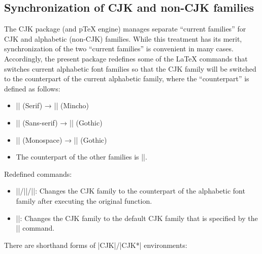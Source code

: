 \documentclass[a4paper]{article}
\newcommand{\Pkg}[1]{\textsf{#1}}
\newcommand{\Means}{:\hspace{1em plus 1em}}
\newcommand{\wbr}{\linebreak[0]}
\providecommand{\pTeX}{p\TeX}
\begin{document}
\subsection{Synchronization of CJK and non-CJK families}
\label{ssec:sync-families}

The \Pkg{CJK} package (and {\pTeX} engine) manages separate
``current families'' for CJK and alphabetic (non-CJK) families.
While this treatment has its merit, synchronization of the two
``current families'' is convenient in many cases.
Accordingly, the present package redefines some of the {\LaTeX}
commands that switches current alphabetic font families so that
the CJK family will be switched to the counterpart of the current
alphabetic family, where the ``counterpart'' is defined as follows:

\begin{itemize}
\item |\rmfamily| (Serif) → |\mcfamily| (Mincho)
\item |\sffamily| (Sans-serif) → |\gtfamily| (Gothic)
\item |\ttfamily| (Monospace) → |\gtfamily| (Gothic)
\item The counterpart of the other families is |\mcfamily|.
\end{itemize}

Redefined commands:

\begin{itemize}
\item |\rmfamily|/|\sffamily|/|\ttfamily|\Means
  Changes the CJK family to the counterpart of the alphabetic font
  family after executing the original function.
\item |\normalfont|\Means
  Changes the CJK family to the default CJK family that is specified
  by the |\setCJKfamilydefault| command.
\end{itemize}

There are shorthand forms of |CJK|/\wbr|CJK*| environments:
\end{document}
